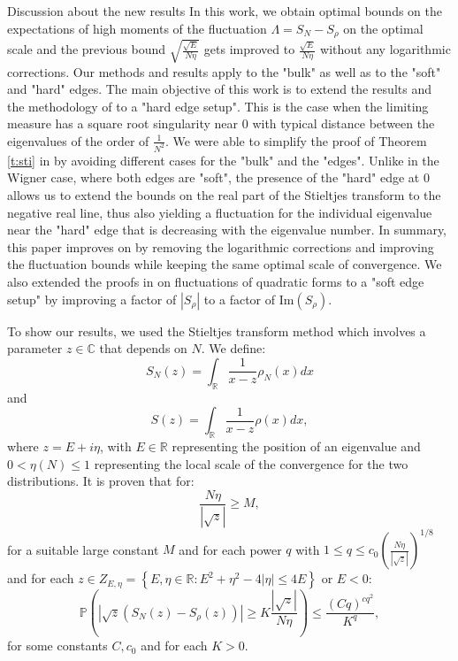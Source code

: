 \documentclass[11pt, a4paper, oneside]{book}
\numberwithin{equation}{chapter}
\begin{document}
\begin{section}{Discussion about the new results}
In this work, we obtain optimal bounds on the expectations of high moments of the fluctuation $\Lambda = S_N - S_{\rho}$ on the optimal scale and the previous bound $\sqrt{\frac{\sqrt{E}}{N\eta}}$ gets improved to ${\frac{\sqrt{E}}{N\eta}}$ without any logarithmic corrections. Our methods and results apply to the "bulk" as well as to the "soft" and "hard" edges. The main objective of this work is to extend the results and the methodology of \cite{cacciapuoti2015bounds} to a "hard edge setup". This is the case when the limiting measure has a square root singularity near $0$ with typical distance between the eigenvalues of the order of $\frac{1}{N^2}.$ We were able to simplify the proof of Theorem \ref{t:sti} in \cite{cacciapuoti2015bounds} by avoiding different cases for the "bulk" and the "edges". Unlike in the Wigner case, where both edges are "soft", the presence of the "hard" edge at $0$ allows us to extend the bounds on the real part of the Stieltjes transform to the negative real line, thus also yielding a fluctuation for the individual eigenvalue near the "hard" edge that is decreasing with the eigenvalue number. In summary, this paper improves on \cite{cacciapuoti2013local} by removing the logarithmic corrections and improving the fluctuation bounds while keeping the same optimal scale of convergence. We also extended the proofs in \cite{gotze2016optimal,gotze2014rate} on fluctuations of quadratic forms to a "soft edge setup" by improving a factor of $|S_{\rho}|$ to a factor of $\mathrm{Im} (S_{\rho})$.

To show our results, we used the Stieltjes transform method which involves a parameter ${z \in \mathbb{C}} $ that depends on $N$. We define:
%
$$ S_N(z) = \int_{\mathbb{R}} \frac{1}{x-z} \rho_N(x) dx $$ and
%
$$ S(z) = \int_{\mathbb{R}} \frac{1}{x-z} \rho(x) dx, $$
where $z = E +i\eta$, with $E \in \mathbb{R}$ representing the position of an eigenvalue and $0<\eta(N)\leq 1$ representing the local scale of the convergence for the two distributions. It is proven that for:
%
\begin{equation} \label{Neta}
\frac{N\eta}{|\sqrt{z}|} \geq M,
\end{equation}
for a suitable large  constant $M$ and for each power $q$ with $1 \leq q \leq c_0 \left (\frac{N\eta}{|\sqrt{z}|} \right )^{1/8} $ and for each $z \in Z_{E,\eta} = \left \{E,\eta \in \mathbb{R} : E^2 + \eta^2 -4 |\eta | \leq 4E \right \} $ or $E<0:$
%
\begin{equation} \label{thm2}
\mathbb{P} \left ( |\sqrt{z} ( S_N (z) - S_{\rho}(z) ) | \geq K \frac{| \sqrt{z}|}{N\eta} \right ) \leq \frac{(Cq)^{cq^2}}{K^q} ,
\end{equation}
for some constants $C,c_0$ and for each $K>0.$


\end{section}
\end{document}
